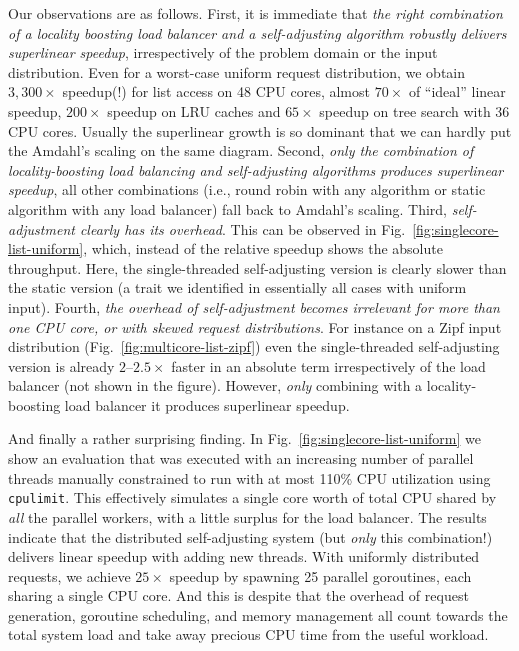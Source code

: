 Our observations are as follows. First, it is immediate that \emph{the right combination of a locality boosting load balancer and a self-adjusting algorithm robustly delivers superlinear speedup}, irrespectively of the problem domain or the input distribution. Even for a worst-case uniform request distribution, we obtain $3,300\times$ speedup(!) for list access on 48 CPU cores, almost $70\times$ of ``ideal'' linear speedup, $200\times$ speedup on LRU caches and $65\times$ speedup on tree search with 36 CPU cores. Usually the superlinear growth is so dominant that we can hardly put the Amdahl's scaling on the same diagram.  Second, \emph{only the combination of locality-boosting load balancing and self-adjusting algorithms produces superlinear speedup}, all other combinations (i.e., round robin with any algorithm or static algorithm with any load balancer) fall back to Amdahl's scaling.  Third, \emph{self-adjustment clearly has its overhead}. This can be observed in Fig.~\ref{fig:singlecore-list-uniform}, which, instead of the relative speedup shows the absolute throughput. Here, the single-threaded self-adjusting version is clearly slower than the static version (a trait we identified in essentially all cases with uniform input). Fourth, \emph{the overhead of self-adjustment becomes irrelevant for more than one CPU core, or with skewed request distributions}. For instance on a Zipf input distribution (Fig.~\ref{fig:multicore-list-zipf}) even the single-threaded self-adjusting version is already $2$--$2.5\times$ faster in an absolute term irrespectively of the load balancer (not shown in the figure). However, \emph{only} combining with a locality-boosting load balancer it produces superlinear speedup.

And finally a rather surprising finding. In Fig.~\ref{fig:singlecore-list-uniform} we show an evaluation that was executed with an increasing number of parallel threads manually constrained to run with at most 110\% CPU utilization using \texttt{cpulimit}. This effectively simulates a single core worth of total CPU shared by \emph{all} the parallel workers, with a little surplus for the load balancer. The results indicate that the distributed self-adjusting system (but \emph{only} this combination!) delivers linear speedup with adding new threads. With uniformly distributed requests, we achieve $25\times$ speedup by spawning 25 parallel goroutines, each sharing a single CPU core.  And this is despite that the overhead of request generation, goroutine scheduling, and memory management all count towards the total system load and take away precious CPU time from the useful workload.

